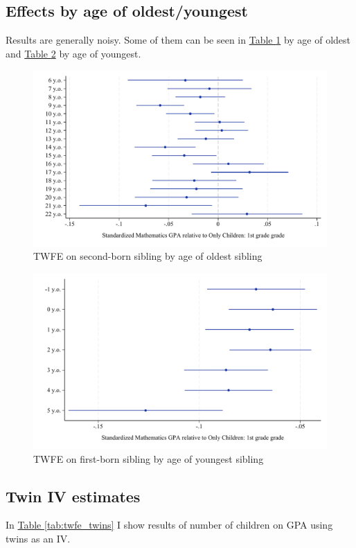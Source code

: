 \clearpage
\subsection{Effects by age of oldest/youngest}

Results are generally noisy. Some of them can be seen in \hyperref[fig:fig_by_age_oldest]{Table \ref{fig:fig_by_age_oldest}} by age of oldest and  \hyperref[fig:fig_by_age_youngest]{Table \ref{fig:fig_by_age_youngest}} by age of youngest.


\begin{figure}[htbp]
    \centering
        \includegraphics[width=\textwidth]{./FIGURES/TWFE/twfe_age_oldest_g1_gpa_m_adj_Tsiblings_2_Ssecond_4.pdf}
        \caption{TWFE on second-born sibling by age of oldest sibling}
        \label{fig:fig_by_age_oldest}

\end{figure}

\begin{figure}[htbp]
    \centering
    \includegraphics[width=\textwidth]{./FIGURES/TWFE/twfe_age_youngest_g1_gpa_m_adj_Tsiblings_2_Soldest_4.pdf}
        \caption{TWFE on first-born sibling by age of youngest sibling}
    \label{fig:fig_by_age_youngest}

\end{figure}

\clearpage
\subsection{Twin IV estimates}

In \hyperref[tab:twfe_twins]{Table \ref{tab:twfe_twins}} I show results of number of children on GPA using twins as an IV.




\newpage

